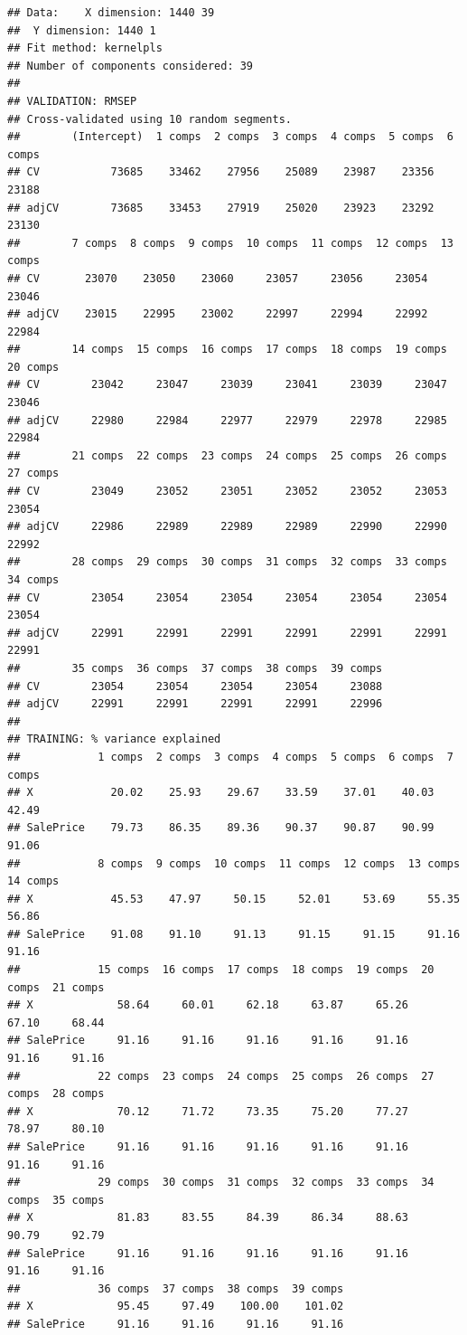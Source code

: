 \documentclass[
]{article}
\begin{document}
\begin{verbatim}
## Data:    X dimension: 1440 39 
##  Y dimension: 1440 1
## Fit method: kernelpls
## Number of components considered: 39
## 
## VALIDATION: RMSEP
## Cross-validated using 10 random segments.
##        (Intercept)  1 comps  2 comps  3 comps  4 comps  5 comps  6 comps
## CV           73685    33462    27956    25089    23987    23356    23188
## adjCV        73685    33453    27919    25020    23923    23292    23130
##        7 comps  8 comps  9 comps  10 comps  11 comps  12 comps  13 comps
## CV       23070    23050    23060     23057     23056     23054     23046
## adjCV    23015    22995    23002     22997     22994     22992     22984
##        14 comps  15 comps  16 comps  17 comps  18 comps  19 comps  20 comps
## CV        23042     23047     23039     23041     23039     23047     23046
## adjCV     22980     22984     22977     22979     22978     22985     22984
##        21 comps  22 comps  23 comps  24 comps  25 comps  26 comps  27 comps
## CV        23049     23052     23051     23052     23052     23053     23054
## adjCV     22986     22989     22989     22989     22990     22990     22992
##        28 comps  29 comps  30 comps  31 comps  32 comps  33 comps  34 comps
## CV        23054     23054     23054     23054     23054     23054     23054
## adjCV     22991     22991     22991     22991     22991     22991     22991
##        35 comps  36 comps  37 comps  38 comps  39 comps
## CV        23054     23054     23054     23054     23088
## adjCV     22991     22991     22991     22991     22996
## 
## TRAINING: % variance explained
##            1 comps  2 comps  3 comps  4 comps  5 comps  6 comps  7 comps
## X            20.02    25.93    29.67    33.59    37.01    40.03    42.49
## SalePrice    79.73    86.35    89.36    90.37    90.87    90.99    91.06
##            8 comps  9 comps  10 comps  11 comps  12 comps  13 comps  14 comps
## X            45.53    47.97     50.15     52.01     53.69     55.35     56.86
## SalePrice    91.08    91.10     91.13     91.15     91.15     91.16     91.16
##            15 comps  16 comps  17 comps  18 comps  19 comps  20 comps  21 comps
## X             58.64     60.01     62.18     63.87     65.26     67.10     68.44
## SalePrice     91.16     91.16     91.16     91.16     91.16     91.16     91.16
##            22 comps  23 comps  24 comps  25 comps  26 comps  27 comps  28 comps
## X             70.12     71.72     73.35     75.20     77.27     78.97     80.10
## SalePrice     91.16     91.16     91.16     91.16     91.16     91.16     91.16
##            29 comps  30 comps  31 comps  32 comps  33 comps  34 comps  35 comps
## X             81.83     83.55     84.39     86.34     88.63     90.79     92.79
## SalePrice     91.16     91.16     91.16     91.16     91.16     91.16     91.16
##            36 comps  37 comps  38 comps  39 comps
## X             95.45     97.49    100.00    101.02
## SalePrice     91.16     91.16     91.16     91.16
\end{verbatim}
\end{document}
